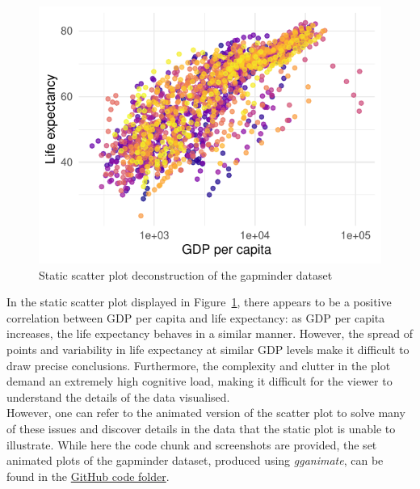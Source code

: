 \documentclass{article}\usepackage[]{graphicx}\usepackage[]{xcolor}
\makeatletter
\def\maxwidth{ %
  \ifdim\Gin@nat@width>\linewidth
    \linewidth
  \else
    \Gin@nat@width
  \fi
}
\newenvironment{knitrout}{}{} %
\numberwithin{equation}{section}
\makeatother
\begin{document}
\begin{knitrout}\scriptsize
{}\color{fgcolor}\begin{figure}[H]

{\centering \includegraphics[width=\maxwidth]{figure/beamer-gapminder_static-1} 

}

\caption[Static scatter plot deconstruction of the gapminder dataset]{Static scatter plot deconstruction of the gapminder dataset}\label{fig:gapminder_static}
\end{figure}

\end{knitrout}

\noindent
In the static scatter plot displayed in Figure~\ref{fig:gapminder_static}, there appears to be a positive correlation between GDP per capita and life expectancy: as GDP per capita increases, the life expectancy behaves in a similar manner. However, the spread of points and variability in life expectancy at similar GDP levels make it difficult to draw precise conclusions. Furthermore, the complexity and clutter in the plot demand an extremely high cognitive load, making it difficult for the viewer to understand the details of the data visualised.\\ 

\noindent
However, one can refer to the animated version of the scatter plot to solve many of these issues and discover details in the data that the static plot is unable to illustrate. While here the code chunk and screenshots are provided, the set animated plots of the gapminder dataset, produced using \textit{gganimate}, can be found in the \href{https://github.com/Qinqing-Li/Data-Visualisation-Project/tree/main/code}{GitHub code folder}. \\
\end{document}
